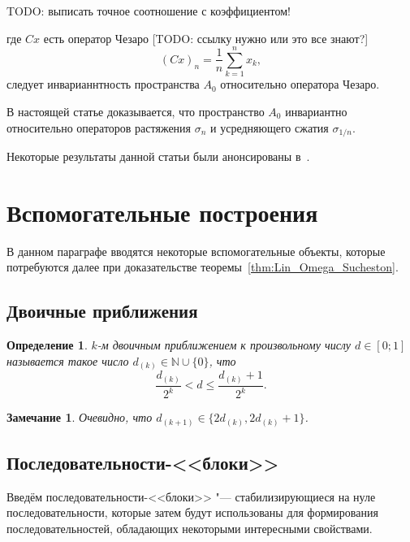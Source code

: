 \documentclass[a4paper,14pt]{article} %
\theoremstyle{plain}
\newtheorem{remark}[lemma]{Замечание}
\newtheorem{definition}[lemma]{Определение}
\begin{document}
TODO: выписать точное соотношение с коэффициентом!

где $Cx$ есть оператор Чезаро [TODO: ссылку нужно или это все знают?]
\begin{equation}
	(Cx)_n = \frac{1}{n} \sum_{k=1}^n x_k
	,
\end{equation}
следует инварианнтность пространства $A_0$ относительно оператора Чезаро.

В настоящей статье доказывается,
что пространство $A_0$ инвариантно относительно операторов растяжения $\sigma_n$
и усредняющего сжатия $\sigma_{1/n}$.


Некоторые результаты данной статьи были анонсированы в~\cite{our-mz2021linearhulls}.

\section{Вспомогательные построения}

В данном параграфе вводятся некоторые вспомогательные объекты,
которые потребуются далее при доказательстве теоремы~\ref{thm:Lin_Omega_Sucheston}.

\subsection{Двоичные приближения}	

\begin{definition}
	$k$-м двоичным приближением к произвольному числу $d\in[0;1]$
	называется такое число $d_{(k)}\in\mathbb{N}\cup\{0\}$,
	что
	\begin{equation}
		\label{eq:binary_approximations_for_number}
		\frac{d_{(k)}}{2^k} < d \leq \frac{d_{(k)}+1}{2^k}
		.
	\end{equation}
\end{definition}

\begin{remark}
	Очевидно, что $d_{(k+1)}\in\{2d_{(k)},2d_{(k)}+1\}$.
\end{remark}

\subsection{Последовательности-<<блоки>>}

Введём последовательности-<<блоки>> "---
стабилизирующиеся на нуле последовательности,
которые затем будут использованы для формирования последовательностей,
обладающих некоторыми интересными свойствами.
\end{document}
